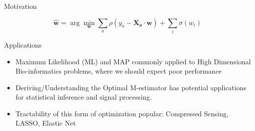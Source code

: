 \documentclass[pdf]{beamer}
\begin{document}
\begin{frame}{Motivation}

\begin{equation*}
            \mathbf{\hat{w}} = \arg\min_\mathbf{w} {\sum_a{\rho(y_a - \mathbf{X_a} \cdot\mathbf{ w})} + \sum_i{\sigma(w_i)}}
\end{equation*}
\vspace{.1in}

\begin{block}{Applications}
\begin{itemize}
\vspace{.1in}
 \item{Maximum Likelihood (ML) and MAP commonly applied to High Dimensional Bio-informatics problems, where we should expect poor performance}
     \vspace{.1in}
 \item{Deriving/Understanding the Optimal M-estimator has potential applications for statistical inference and signal processing.}
     \vspace{.1in}
 \item{ Tractability of this form of optimization popular: Compressed Sensing, LASSO, Elastic Net}
\end{itemize}
\end{block}



\end{frame}
\end{document}
